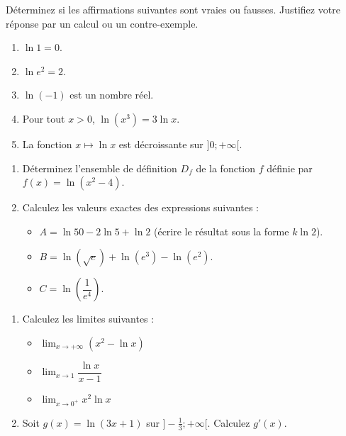 \documentclass[11pt]{article}
\begin{document}
\begin{exercice}
Déterminez si les affirmations suivantes sont vraies ou fausses. Justifiez votre réponse par un calcul ou un contre-exemple.
\begin{enumerate}
    \item $\ln 1 = 0$.
    \item $\ln e^2 = 2$.
    \item $\ln(-1)$ est un nombre réel.
    \item Pour tout $x>0$, $\ln(x^3) = 3\ln x$.
    \item La fonction $x \mapsto \ln x$ est décroissante sur $]0;+\infty[$.
\end{enumerate}
\end{exercice}

\begin{exercice}
\begin{enumerate}
    \item Déterminez l'ensemble de définition $D_f$ de la fonction $f$ définie par $f(x) = \ln(x^2 - 4)$.
    \item Calculez les valeurs exactes des expressions suivantes :
    \begin{itemize}
        \item $A = \ln 50 - 2\ln 5 + \ln 2$ (écrire le résultat sous la forme $k\ln 2$).
        \item $B = \ln(\sqrt{e}) + \ln(e^3) - \ln(e^2)$.
        \item $C = \ln\left(\dfrac{1}{e^4}\right)$.
    \end{itemize}
\end{enumerate}
\end{exercice}

\begin{exercice}
\begin{enumerate}
    \item Calculez les limites suivantes :
    \begin{itemize}
        \item $\displaystyle\lim_{x\to +\infty} (x^2 - \ln x)$
        \item $\displaystyle\lim_{x\to 1} \dfrac{\ln x}{x-1}$
        \item $\displaystyle\lim_{x\to 0^+} x^2 \ln x$
    \end{itemize}
    \item Soit $g(x) = \ln(3x+1)$ sur $]-\frac{1}{3};+\infty[$. Calculez $g'(x)$.
\end{enumerate}
\end{exercice}
\end{document}
